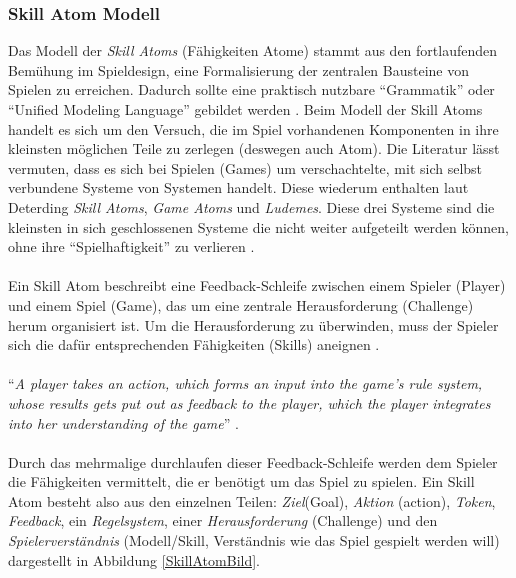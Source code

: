 \documentclass[a4paper,12pt,twoside]{scrartcl}
\begin{document}
\subsubsection{Skill Atom Modell}
Das Modell der \textit{Skill Atoms} (Fähigkeiten Atome) stammt aus den fortlaufenden
Bemühung im Spieldesign, eine Formalisierung der zentralen Bausteine von Spielen zu erreichen. Dadurch sollte eine praktisch nutzbare \enquote{Grammatik} oder \enquote{Unified Modeling Language} gebildet werden \cite{Deterding2013}. Beim Modell der Skill Atoms handelt es sich um den Versuch, die im Spiel vorhandenen Komponenten in ihre kleinsten möglichen Teile zu zerlegen (deswegen auch Atom). Die Literatur lässt vermuten, dass es sich bei Spielen (Games) um verschachtelte, mit sich selbst verbundene Systeme von Systemen handelt. Diese wiederum enthalten laut Deterding \textit{Skill Atoms}, \textit{Game Atoms} und \textit{Ludemes}. Diese drei Systeme sind die kleinsten in sich geschlossenen Systeme die nicht weiter aufgeteilt werden können, ohne ihre \enquote{Spielhaftigkeit} zu verlieren \cite{Deterding2013}.
\\\\
Ein Skill Atom beschreibt eine Feedback-Schleife zwischen einem Spieler (Player) und einem Spiel (Game), das um eine zentrale Herausforderung (Challenge) herum organisiert ist. Um die Herausforderung zu überwinden, muss der Spieler sich die dafür entsprechenden Fähigkeiten (Skills) aneignen \cite{SkillAtoms2006}.
\\\\
\enquote{\textit{A player takes an action, which forms an input into the game’s rule system, whose results gets put out as feedback to the player, which the player integrates into her understanding of the game}} \cite{Deterding2013}.
\\\\
Durch das mehrmalige durchlaufen dieser Feedback-Schleife werden dem Spieler die Fähigkeiten vermittelt, die er benötigt um das Spiel zu spielen. Ein Skill Atom besteht also aus den einzelnen Teilen: \textit{Ziel}(Goal), \textit{Aktion} (action), \textit{Token}, \textit{Feedback}, ein \textit{Regelsystem}, einer \textit{Herausforderung} (Challenge) und den \textit{Spielerverständnis} (Modell/Skill, Verständnis wie das Spiel gespielt werden will) dargestellt in Abbildung \ref{SkillAtomBild}.    
\\
\end{document}
